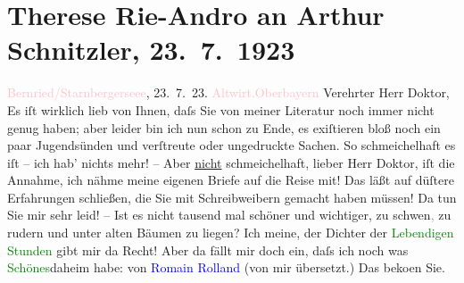 

               \section[Therese Rie-Andro an Arthur Schnitzler, 23. 7. 1923]{ Therese Rie-Andro an Arthur Schnitzler, 23. 7. 1923}\nopagebreak{}\rehead{ }\normalsize\beginnumbering{} \toendnotes[C]{\smallbreak\pagebreak[2]} 
\toendnotes[C]{\smallbreak}\pstart
           \raggedleft{}{\pb}\textcolor{pink}{Bernried/Starnbergerseee}{}\ledrightnote{\textcolor{pink}{Bernried}},
                     23. 7. 23. \pend
           \pstart
           \raggedleft{}\textcolor{pink}{Altwirt.}{}\ledrightnote{\textcolor{pink}{Hotel Seeblick}}\hspace*{1.5em}\textcolor{pink}{Oberbayern}{}\ledrightnote{\textcolor{pink}{Oberbayern}}\pend
           \pstart{}Verehrter Herr Doktor,\pend\pstart
           Es iſt wirklich lieb von Ihnen, daſs Sie von meiner Literatur noch immer nicht genug
               haben; aber leider bin ich nun schon zu Ende, es exiſtieren bloß noch ein paar
               Jugendsünden und verſtreute oder ungedruckte Sachen. So schmeichelhaft es iſt – ich
               hab’ nichts mehr! – Aber \uline{nicht} schmeichelhaft, lieber
               Herr Doktor, iſt die Annahme, ich nähme meine eigenen Briefe auf die Reise mit! Das
               läßt auf düſtere Erfahrungen schließen, die Sie mit Schreibweibern gemacht haben
               müssen! Da tun Sie mir sehr leid! – Ist es nicht tausend mal schöner und wichtiger,
               zu schw{\geminationm}en\textcolor{gray}{,} zu rudern und unter alten
               Bäumen zu liegen? Ich meine, der Dichter der \textcolor{green}{Lebendigen
                  Stunden}{}\ledrightnote{\textcolor{green}{Lebendige Stunden}} gibt mir da Recht!\pend
           \pstart
           Aber da fällt mir doch ein, daſs ich noch was \textcolor{green}{Schönes}{}\introOben{}daheim\introOben{} habe: von \textcolor{blue}{Romain
                  Rolland}{}\ledrightnote{\textcolor{blue}{Romain Rolland}} (von mir übersetzt.) Das beko{\geminationm}en Sie.
